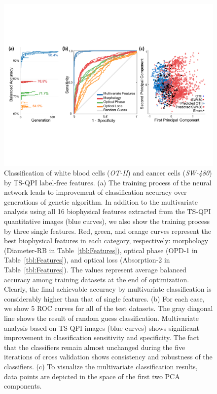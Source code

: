 \documentclass[aps,pra,reprint,superscriptaddress]{revtex4-1}
\begin{document}
\begin{figure}
\includegraphics[scale=0.65]{FigureOTSWROC.pdf}
\caption{\label{fig:OTSWROC} Classification of white blood cells (\textit{OT-II}) and cancer cells (\textit{SW-480}) by TS-QPI label-free features. (a) The training process of the neural network leads to improvement of classification accuracy over generations of genetic algorithm. In addition to the multivariate analysis using all 16 biophysical features extracted from the TS-QPI quantitative images (blue curves), we also show the training process by three single features. Red, green, and orange curves represent the best biophysical features in each category, respectively: morphology (Diameter-RB in Table~\ref{tbl:Features}), optical phase (OPD-1 in Table~\ref{tbl:Features}), and optical loss (Absorption-2 in Table~\ref{tbl:Features}). The values represent average balanced accuracy among training datasets at the end of optimization. Clearly, the final achievable accuracy by multivariate classification is considerably higher than that of single features. (b) For each case, we show 5 ROC curves for all of the test datasets. The gray diagonal line shows the result of random guess classification. Multivariate analysis based on TS-QPI images (blue curves) shows significant improvement in classification sensitivity and specificity. The fact that the classifiers remain almost unchanged during the five iterations of cross validation shows consistency and robustness of the classifiers. (c) To visualize the multivariate classification results, data points are depicted in the space of the first two PCA components.}
\end{figure}
\end{document}
